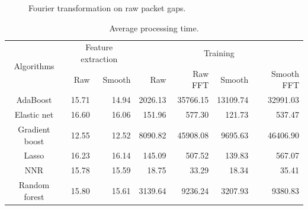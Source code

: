 \begin{figure}[htpb]
   \centering
   \quad
   \caption{Fourier transformation on raw packet gaps.}
   \label{fig:fft}
\end{figure}



\begin{table}[htpb]
   \centering
   \caption{Average processing time.}
   \label{tab:timing}
   \begin{tabular}{|c|r|r|r|r|r|r|}
      \hline
      \multirow{2}{*}{Algorithms} & \multicolumn{2}{c|}{Feature extraction} &
      \multicolumn{4}{c|}{Training} \\ \cline{2-7}
                     & Raw   & Smooth & Raw     & Raw FFT  & Smooth   & Smooth FFT \\ \hline
      AdaBoost       & 15.71 & 14.94  & 2026.13 & 35766.15 & 13109.74 & 32991.03\\
      Elastic net    & 16.60 & 16.06  & 151.96  & 577.30   & 121.73   & 537.47\\
      Gradient boost & 12.55 & 12.52  & 8090.82 & 45908.08 & 9695.63  & 46406.90\\
      Lasso          & 16.23 & 16.14  & 145.09  & 507.52   & 139.83   & 567.07\\
      NNR            & 15.78 & 15.59  & 18.75   & 33.29    & 18.34    & 35.41\\
      Random forest  & 15.80 & 15.61  & 3139.64 & 9236.24  & 3207.93  & 9380.83\\
      \hline
   \end{tabular}
\end{table}

